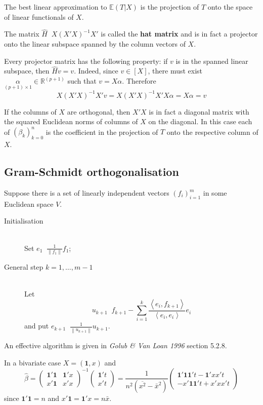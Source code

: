 \documentclass[a4paper]{article}
\newcommand{\clo}[1]{{\left [ #1 \right ]}}
\newcommand{\brac}[1]{{\left ( #1 \right )}}
\newcommand{\nrm}[1]{{\left\| #1 \right \|}}
\newcommand{\brkt}[1]{{\left\langle #1 \right\rangle}}
\newcommand{\Real}{\mathbb{R}}
\newcommand{\Ex}[0]{{\mathbb{E}}}
\newcommand{\one}{\mathbf{1}}
\newcommand{\defn}{\mathop{\overset{\Delta}{=}}\nolimits}
\begin{document}
The best linear approximation to $\Ex(T\rvert X)$ is the projection of $T$ onto
the space of linear functionals of $X$.

The matrix $\hat{H} \defn X\brac{X'X}^{-1}X'$ is called the \textbf{hat matrix} and
is in fact a projector onto the linear subspace spanned by the column vectors of $X$.

Every projector matrix has the following property: if $v$ is in the spanned linear
subspace, then $\hat{H}v = v$. Indeed, since $v\in \clo{X}$, there must exist
$\underset{(p+1)\times 1}{\alpha}\in \Real^{(p+1)}$ such that $v = X\alpha$.
Therefore
\[X\brac{X'X}^{-1}X'v = X\brac{X'X}^{-1}X'X\alpha = X\alpha = v\]

If the columns of $X$ are orthogonal, then $X'X$ is in fact a diagonal matrix
with the squared Euclidean norms of columns of $X$ on the diagonal. In this case
each of $\brac{\beta_k}_{k=0}^n$ is the coefficient in the projection of $T$ onto
the respective column of $X$.


\subsection*{Gram-Schmidt orthogonalisation} %
\label{sub:gram_schmidt_orthogonalisation}

Suppose there is a set of linearly independent vectors $\brac{f_i}_{i=1}^m$ in
some Euclidean space $V$.
\begin{description}
	\item[Initialisation] \hfill \\
		Set $e_1 \defn \frac{1}{\nrm{f_1}} f_1$;
	\item[General step $k=1,\ldots,m-1$] \hfill \\
		Let \[u_{k+1} \defn f_{k+1} - \sum_{i=1}^k \frac{\brkt{e_i, f_{k+1}}}{\brkt{e_i,e_i}} e_i\]
		and put $e_{k+1}\defn \frac{1}{\nrm{u_{k+1}}} u_{k+1}$.
\end{description}
An effective algorithm is given in \emph{Golub \& Van Loan 1996} section 5.2.8.


In a bivariate case $X = (\one,x)$ and
\[\hat{\beta} = \brac{\begin{matrix} \one'\one & \one'x\\ x'\one & x'x \end{matrix}}^{-1} \brac{\begin{matrix} \one't \\ x't \end{matrix}}
= \frac{1}{n^2 \brac{\overline{x^2} - \bar{x}^2}} \brac{\begin{matrix} \one'\one \one't - \one'x x't \\ - x'\one \one't + x'x x't \end{matrix}}
\]
since $\one'\one = n$ and $x'\one = \one'x = n\bar{x}$.
\end{document}
